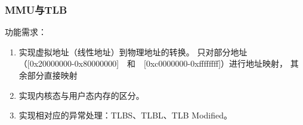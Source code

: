         \subsubsection{MMU与TLB}
            功能需求：
            \begin{enumerate}
            \item
                实现虚拟地址（线性地址）到物理地址的转换。%
                只对部分地址　（[0x20000000-0x80000000]　和　[0xc0000000-0xffffffff]）进行地址映射，
                其余部分直接映射
            \item
                实现内核态与用户态内存的区分。
            \item
                实现相对应的异常处理：TLBS、TLBL、TLB Modified。
            \end{enumerate}

